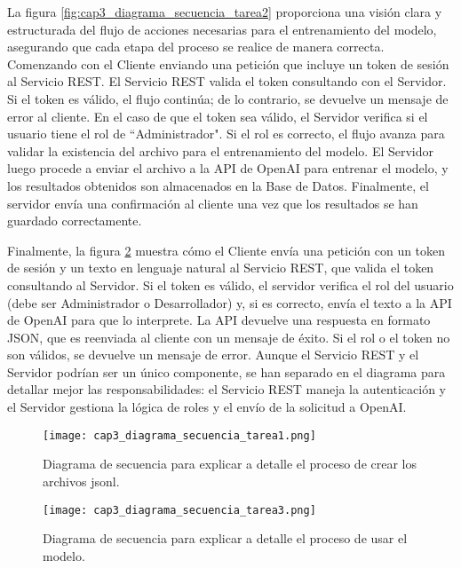 \begin{itemize}
	La figura \ref{fig:cap3_diagrama_secuencia_tarea2} proporciona una visión clara y estructurada del flujo de acciones necesarias para el entrenamiento del modelo, asegurando que cada etapa del proceso se realice de manera correcta. Comenzando con el Cliente enviando una petición que incluye un token de sesión al Servicio REST. El Servicio REST valida el token consultando con el Servidor. Si el token es válido, el flujo continúa; de lo contrario, se devuelve un mensaje de error al cliente. En el caso de que el token sea válido, el Servidor verifica si el usuario tiene el rol de ``Administrador". Si el rol es correcto, el flujo avanza para validar la existencia del archivo para el entrenamiento del modelo. El Servidor luego procede a enviar el archivo a la API de OpenAI para entrenar el modelo, y los resultados obtenidos son almacenados en la Base de Datos. Finalmente, el servidor envía una confirmación al cliente una vez que los resultados se han guardado correctamente.
		
	Finalmente, la figura \ref{fig:cap3_diagrama_secuencia_tarea3} muestra cómo el Cliente envía una petición con un token de sesión y un texto en lenguaje natural al Servicio REST, que valida el token consultando al Servidor. Si el token es válido, el servidor verifica el rol del usuario (debe ser Administrador o Desarrollador) y, si es correcto, envía el texto a la API de OpenAI para que lo interprete. La API devuelve una respuesta en formato JSON, que es reenviada al cliente con un mensaje de éxito. Si el rol o el token no son válidos, se devuelve un mensaje de error. Aunque el Servicio REST y el Servidor podrían ser un único componente, se han separado en el diagrama para detallar mejor las responsabilidades: el Servicio REST maneja la autenticación y el Servidor gestiona la lógica de roles y el envío de la solicitud a OpenAI.
		
	\begin{figure}[H]  
		\centering
		\texttt{[image: cap3\_diagrama\_secuencia\_tarea1.png]}
		\caption{Diagrama de secuencia para explicar a detalle el proceso de crear los archivos jsonl.}
		\label{fig:cap3_diagrama_secuencia_tarea1}
	\end{figure}	
	
	\begin{figure}[H]  
		\centering
		\texttt{[image: cap3\_diagrama\_secuencia\_tarea3.png]}
		\caption{Diagrama de secuencia para explicar a detalle el proceso de usar  el modelo.}
		\label{fig:cap3_diagrama_secuencia_tarea3}
	\end{figure}


\end{itemize}
